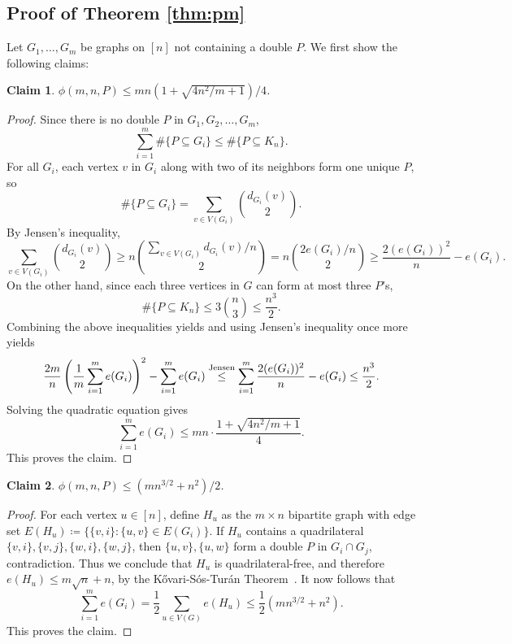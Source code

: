 \documentclass[12pt]{article}
\newtheorem{claim}{Claim}
\begin{document}
\subsection{Proof of Theorem \ref{thm:pm}}

Let $G_1, \ldots, G_m$ be graphs on $[n]$ not containing a double $P$. We first show the following claims:

\begin{claim}\label{claim:upperP-1}
  $\phi(m, n, P) \leq mn(1 + \sqrt{4n^2/m + 1})/4$.
\end{claim}

\begin{proof}
  Since there is no double $P$ in $G_1, G_2, \dots, G_m$,
  \[
  \sum_{i = 1}^m \#\{P \subseteq G_i\} \leq \#\{P \subseteq K_n\}.
  \]
  For all $G_i$, each vertex $v$ in $G_i$ along with two of its neighbors form one unique $P$, so
  \[
    \#\{P \subseteq G_i\} = \sum_{v \in V(G_i)} \binom{d_{G_i}(v)}{2}.
  \]
  By Jensen's inequality,
  \[
    \sum_{v \in V(G_i)} \binom{d_{G_i}(v)}{2} \geq n\binom{\sum_{v \in V(G_i)} d_{G_i}(v)/n}{2} = n\binom{2e(G_i)/n}{2} \geq \frac{2(e(G_i))^2}{n} - e(G_i).
  \]
  On the other hand, since each three vertices in $G$ can form at most three $P$'s, 
  \[
    \#\{P \subseteq K_n\} \leq 3\binom{n}{3} \leq \frac{n^3}{2}.
  \]
  Combining the above inequalities yields and using Jensen's inequality once more yields
  \[
    \frac{2m}{n}\left(\frac{1}{m}\sum_{i = 1}^m e(G_i)\right)^2 - \sum_{i = 1}^m e(G_i) \overset{\rm Jensen}{\leq} \sum_{i = 1}^m \frac{2(e(G_i))^2}{n} - e(G_i) \leq \frac{n^3}{2}.
  \]
  Solving the quadratic equation gives
  \[
    \sum_{i = 1}^m e(G_i) \leq mn \cdot \frac{1 + \sqrt{4n^2/m + 1}}{4}.
  \]
  This proves the claim.
\end{proof}

\begin{claim}\label{claim:upperP-2}
  $\phi(m, n, P) \leq (mn^{3/2} + n^2)/2$. 
\end{claim}

\begin{proof}
  For each vertex $u \in [n]$, define $H_u$ as the $m \times n$ bipartite graph with edge set $E(H_u) \coloneq \{\{v, i\} : \{u, v\} \in E(G_i)\}$. If $H_u$ contains a quadrilateral $\{v, i\}, \{v, j\}, \{w, i\}, \{w, j\}$, then $\{u, v\}, \{u, w\}$ form a double $P$ in $G_i \cap G_j$, contradiction. Thus we conclude that $H_u$ is quadrilateral-free, and therefore $e(H_u) \leq m\sqrt{n} + n$, by the K\H{o}vari-S\'{o}s-Tur\'{a}n Theorem~\cite{KovariSosTuran1954}. It now follows that
  \[
    \sum_{i = 1}^m e(G_i) = \frac{1}{2}\sum_{u \in V(G)} e(H_u) \leq \frac{1}{2}(mn^{3/2} + n^2).
  \]
  This proves the claim.
\end{proof}
\end{document}
